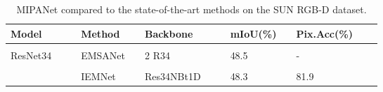 \documentclass{aims}
\numberwithin{equation}{section}
\begin{document}
\begin{table}[t]
  \centering
  \caption{MIPANet compared to the state-of-the-art methods on the SUN RGB-D dataset.}
    \begin{tabular}{lllllllllllll}
    \toprule
    \toprule
    Model &       &       & Method &       &        Backbone &       &       & mIoU(\%)  &       &        Pix.Acc(\%) \\
    \midrule
          &       &       &       &       &       &       &       &       &       &       &         \\
    ResNet34 &       &       & EMSANet\cite{seichter2022efficient} &       &        2   R34 &       &       & 48.5  &       &        - \\
          &       &       &       &       &       &       &       &       &       &       &         \\
         &       &       & IEMNet\cite{xu2023interactive} &       &        Res34NBt1D &       &       & 48.3  &       &        81.9 \\
          

\end{tabular}
\end{table}
\end{document}
